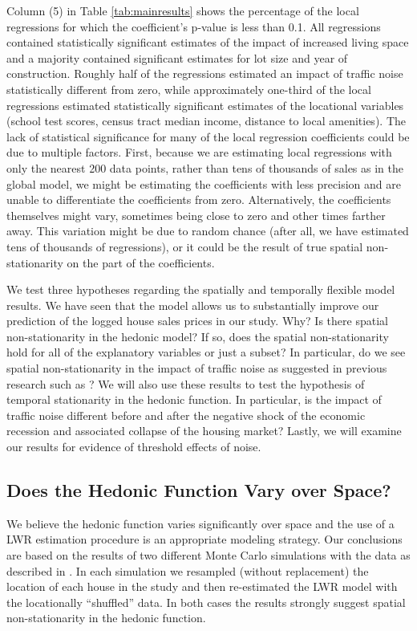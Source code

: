 \documentclass{article}\usepackage{graphicx, color}
\begin{document}
Column (5) in Table \ref{tab:mainresults} shows the percentage of the local regressions for which the coefficient's p-value is less than 0.1. All regressions contained statistically significant estimates of the impact of increased living space and a majority contained significant estimates for lot size and year of construction. Roughly half of the regressions estimated an impact of traffic noise statistically different from zero, while approximately one-third of the local regressions estimated statistically significant estimates of the locational variables (school test scores, census tract median income, distance to local amenities). The lack of statistical significance for many of the local regression coefficients could be due to multiple factors. First, because we are estimating local regressions with only the nearest 200 data points, rather than tens of thousands of sales as in the global model, we might be estimating the coefficients with less precision and are unable to differentiate the coefficients from zero. Alternatively, the coefficients themselves might vary, sometimes being close to zero and other times farther away. This variation might be due to random chance (after all, we have estimated tens of thousands of regressions), or it could be the result of true spatial non-stationarity on the part of the coefficients. 

We test three hypotheses regarding the spatially and temporally flexible model results. We have seen that the model allows us to substantially improve our prediction of the logged house sales prices in our study. Why? Is there spatial non-stationarity in the hedonic model? If so, does the spatial non-stationarity hold for all of the explanatory variables or just a subset? In particular, do we see spatial non-stationarity in the impact of traffic noise as suggested in previous research such as \citet{MarmolejoDuarteCarlos;GonzalezTamez2009}? We will also use these results to test the hypothesis of temporal stationarity in the hedonic function. In particular, is the impact of traffic noise different before and after the negative shock of the economic recession and associated collapse of the housing market? Lastly, we will examine our results for evidence of threshold effects of noise. 

\subsection{Does the Hedonic Function Vary over Space?}
We believe the hedonic function varies significantly over space and the use of a LWR estimation procedure is an appropriate modeling strategy. Our conclusions are based on the results of two different Monte Carlo simulations with the data as described in \citet{Fotheringham2002}. In each simulation we resampled (without replacement) the location of each house in the study and then re-estimated the LWR model with the locationally ``shuffled'' data. In both cases the results strongly suggest spatial non-stationarity in the hedonic function. 
\end{document}
